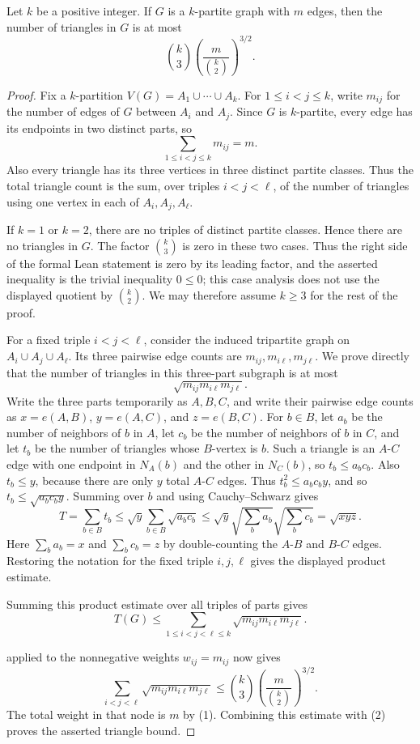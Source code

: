 \begin{lemma}
Let $k$ be a positive integer.  If $G$ is a $k$-partite graph with $m$ edges,
then the number of triangles in $G$ is at most
\[
\binom{k}{3}\left(\frac{m}{\binom{k}{2}}\right)^{3/2}.
\]
\end{lemma}
\begin{proof}
Fix a $k$-partition $V(G)=A_1\cup\cdots\cup A_k$.  For
$1\le i<j\le k$, write $m_{ij}$ for the number of edges of $G$ between
$A_i$ and $A_j$.  Since $G$ is $k$-partite, every edge has its endpoints in
two distinct parts, so
\[
\sum_{1\le i<j\le k}m_{ij}=m. \tag{1}
\]
Also every triangle has its three vertices in three distinct partite
classes.  Thus the total triangle count is the sum, over triples
$i<j<\ell$, of the number of triangles using one vertex in each of
$A_i,A_j,A_\ell$.

If $k=1$ or $k=2$, there are no triples of distinct partite classes.  Hence
there are no triangles in $G$.  The factor $\binom{k}{3}$ is zero in these
two cases.  Thus the right side of the formal Lean statement is zero by its
leading factor, and the asserted inequality is the trivial inequality
$0\le 0$; this case analysis does not use the displayed quotient by
$\binom{k}{2}$.  We may therefore assume $k\ge 3$ for the rest of the proof.

For a fixed triple $i<j<\ell$, consider the induced tripartite graph on
$A_i\cup A_j\cup A_\ell$.  Its three pairwise edge counts are
$m_{ij},m_{i\ell},m_{j\ell}$.  We prove directly that the number of triangles
in this three-part subgraph is at most
\[
\sqrt{m_{ij}m_{i\ell}m_{j\ell}}.
\]
Write the three parts temporarily as $A,B,C$, and write their pairwise edge
counts as $x=e(A,B)$, $y=e(A,C)$, and $z=e(B,C)$.  For $b\in B$, let $a_b$
be the number of neighbors of $b$ in $A$, let $c_b$ be the number of
neighbors of $b$ in $C$, and let $t_b$ be the number of triangles whose
$B$-vertex is $b$.  Such a triangle is an $A$-$C$ edge with one endpoint in
$N_A(b)$ and the other in $N_C(b)$, so $t_b\le a_bc_b$.  Also $t_b\le y$,
because there are only $y$ total $A$-$C$ edges.  Thus
$t_b^2\le a_bc_by$, and so $t_b\le \sqrt{a_bc_by}$.  Summing over $b$ and
using Cauchy--Schwarz gives
\[
T=\sum_{b\in B}t_b
\le \sqrt y\sum_{b\in B}\sqrt{a_bc_b}
\le \sqrt y\sqrt{\sum_b a_b}\sqrt{\sum_b c_b}
=\sqrt{xyz}.
\]
Here $\sum_b a_b=x$ and $\sum_b c_b=z$ by double-counting the $A$-$B$ and
$B$-$C$ edges.  Restoring the notation for the fixed triple
$i,j,\ell$ gives the displayed product estimate.

Summing this product estimate over all triples of parts gives
\[
T(G)\le
\sum_{1\le i<j<\ell\le k}\sqrt{m_{ij}m_{i\ell}m_{j\ell}}. \tag{2}
\]

 applied to the nonnegative
weights $w_{ij}=m_{ij}$ now gives
\[
\sum_{i<j<\ell}\sqrt{m_{ij}m_{i\ell}m_{j\ell}}
\le
\binom{k}{3}
\left(\frac{m}{\binom{k}{2}}\right)^{3/2}.
\]
The total weight in that node is $m$ by (1).  Combining this estimate with
(2) proves the asserted triangle bound.
\end{proof}
